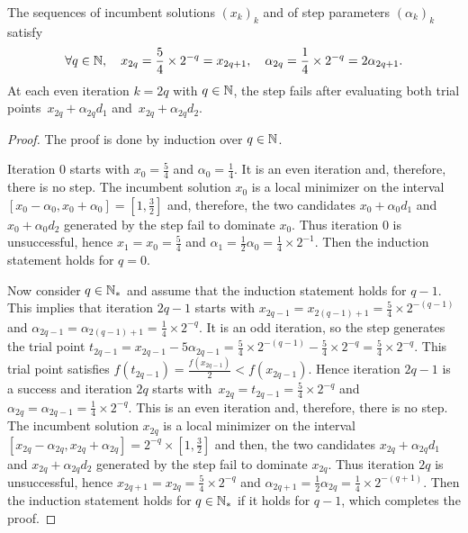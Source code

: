 \vspace{0.1cm}

\begin{lemma}
	\label{prop:expression_sequences_mads}
	The sequences of incumbent solutions $(x_k)_k$ and of step parameters $(\alpha_k)_k$ satisfy
	\begin{equation*}
		\forall q \in \mathbb{N},
		\quad
		x_{2q} = \frac{5}{4}\times 2^{-q} = x_{2q+1},
		\quad
		\alpha_{2q} = \frac{1}{4}\times 2^{-q} = 2\alpha_{2q+1}.
	\end{equation*}
	At each even iteration $k=2q$ with $q \in \mathbb{N}$, the \poll step fails after evaluating both trial points~$x_{2q}+\alpha_{2q}d_1$ and~$x_{2q}+\alpha_{2q}d_2$.
\end{lemma}

\begin{proof}
	The proof is done by induction over $q \in \mathbb{N}$.
	
	Iteration $0$ starts with $x_0 = \frac{5}{4}$ and $\alpha_0 = \frac{1}{4}$.
	It is an even iteration and, therefore, there is no \search step.
	The incumbent solution $x_0$ is a local minimizer on the interval $[x_0 - \alpha_0, x_0 + \alpha_0] = [1, \frac{3}{2}]$ and, therefore, the two candidates $x_0+\alpha_0d_1$ and $x_0+\alpha_0d_2$ generated by the \poll step fail to dominate $x_0$.
	Thus iteration $0$ is unsuccessful, hence $x_1 = x_0 = \frac{5}{4}$ and $\alpha_1 = \frac{1}{2}\alpha_0 = \frac{1}{4}\times 2^{-1}$.
	Then the induction statement holds for $q = 0$.
	
	Now consider $q \in \mathbb{N}_*$ and assume that the induction statement holds for $q-1$.
	This implies that iteration $2q-1$ starts with $x_{2q-1} = x_{2(q-1)+1} = \frac{5}{4}\times 2^{-(q-1)}$ and $\alpha_{2q-1} = \alpha_{2(q-1)+1} = \frac{1}{4}\times 2^{-q}$.
	It is an odd iteration, so the \search step generates the trial point $t_{2q-1} = x_{2q-1} - 5\alpha_{2q-1} = \frac{5}{4}\times 2^{-(q-1)} -\frac{5}{4}\times 2^{-q} = \frac{5}{4}\times 2^{-q}$.
	This trial point satisfies $f(t_{2q-1}) = \frac{f(x_{2q-1})}{2} < f(x_{2q-1})$. Hence iteration $2q-1$ is a success and iteration $2q$ starts with~$x_{2q} = t_{2q-1} = \frac{5}{4}\times 2^{-q}$ and $\alpha_{2q} = \alpha_{2q-1} = \frac{1}{4}\times 2^{-q}$.
	This is an even iteration and, therefore, there is no \search step.
	The incumbent solution $x_{2q}$ is a local minimizer on the interval~$[x_{2q} - \alpha_{2q}, x_{2q} + \alpha_{2q}] = 2^{-q}\times[1, \frac{3}{2}]$ and then, the two candidates $x_{2q}+\alpha_{2q}d_1$ and $x_{2q}+\alpha_{2q}d_2$ generated by the \poll step fail to dominate $x_{2q}$.
	Thus iteration $2q$ is unsuccessful, hence $x_{2q+1} = x_{2q} = \frac{5}{4}\times 2^{-q}$ and $\alpha_{2q+1} = \frac{1}{2}\alpha_{2q} = \frac{1}{4}\times 2^{-(q+1)}$.
	Then the induction statement holds for $q \in \mathbb{N}_*$ if it holds for $q-1$, which completes the proof.
\end{proof}

